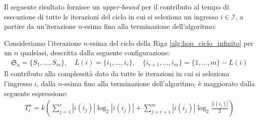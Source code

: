 Il seguente risultato fornisce un \emph{upper-bound} per il contributo al tempo di esecuzione di tutte le iterazioni del ciclo in cui si seleziona un ingresso $i \in \mathcal{I}$, a partire da un'iterazione $n$-esima fino alla terminazione dell'algoritmo:
\begin{theorem}
    Consideriamo l'iterazione $n$-esima del ciclo della Riga \ref{alg:hop_ciclo_infinito} per un $n$ qualsiasi, descritta dalla seguente configurazione:
    \begin{gather*}
        \mathfrak{S}_n = \{S_1,\dots,S_m\}, \quad L(i) = \{i_1,\dots,i_r\}, \quad  \{i_{r+1},\dots,i_m\} = \{1,\dots,m\} - L(i)
    \end{gather*}
    Il contributo alla complessità dato da tutte le iterazioni in cui si seleziona l'ingresso $i$, dalla $n$-esima fino alla terminazione dell'algoritmo, è maggiorato dalla seguente espressione:
    \begin{gather*}
        T_i^n = k\left(\sum_{j = 1}^r |i(i_j)|\log_2|i(i_j)| + \sum_{j = r+1}^m |i(i_j)|\log_2\frac{|i(i_j)|}{2}\right)
    \end{gather*}
\end{theorem}
